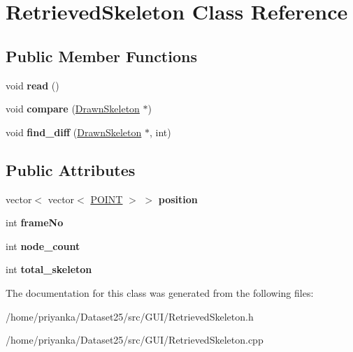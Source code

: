 \hypertarget{classRetrievedSkeleton}{\section{\-Retrieved\-Skeleton \-Class \-Reference}
\label{classRetrievedSkeleton}
}
\subsection*{\-Public \-Member \-Functions}
\begin{DoxyCompactItemize}
\item 
\hypertarget{classRetrievedSkeleton_ab0b91142796e5bce5653b47a7449d54d}{void {\bfseries read} ()}\label{classRetrievedSkeleton_ab0b91142796e5bce5653b47a7449d54d}

\item 
\hypertarget{classRetrievedSkeleton_aff6b1eec8bb28e9571c6d81f3b4ee6a5}{void {\bfseries compare} (\hyperlink{classDrawnSkeleton}{\-Drawn\-Skeleton} $\ast$)}\label{classRetrievedSkeleton_aff6b1eec8bb28e9571c6d81f3b4ee6a5}

\item 
\hypertarget{classRetrievedSkeleton_ab958835824565862540ba0cc701358da}{void {\bfseries find\-\_\-diff} (\hyperlink{classDrawnSkeleton}{\-Drawn\-Skeleton} $\ast$, int)}\label{classRetrievedSkeleton_ab958835824565862540ba0cc701358da}

\end{DoxyCompactItemize}
\subsection*{\-Public \-Attributes}
\begin{DoxyCompactItemize}
\item 
\hypertarget{classRetrievedSkeleton_ad60fef3aad1bc9f9425c6bea6633c268}{vector$<$ vector$<$ \hyperlink{structPOINT}{\-P\-O\-I\-N\-T} $>$ $>$ {\bfseries position}}\label{classRetrievedSkeleton_ad60fef3aad1bc9f9425c6bea6633c268}

\item 
\hypertarget{classRetrievedSkeleton_aad667e65274158e4b5586136b52f137f}{int {\bfseries frame\-No}}\label{classRetrievedSkeleton_aad667e65274158e4b5586136b52f137f}

\item 
\hypertarget{classRetrievedSkeleton_a03732ee286c4c0fe55faa62e5cca2490}{int {\bfseries node\-\_\-count}}\label{classRetrievedSkeleton_a03732ee286c4c0fe55faa62e5cca2490}

\item 
\hypertarget{classRetrievedSkeleton_abdca9dec6d142fc784a6c7712fe54bf9}{int {\bfseries total\-\_\-skeleton}}\label{classRetrievedSkeleton_abdca9dec6d142fc784a6c7712fe54bf9}

\end{DoxyCompactItemize}


\-The documentation for this class was generated from the following files\-:\begin{DoxyCompactItemize}
\item 
/home/priyanka/\-Dataset25/src/\-G\-U\-I/\-Retrieved\-Skeleton.\-h\item 
/home/priyanka/\-Dataset25/src/\-G\-U\-I/\-Retrieved\-Skeleton.\-cpp\end{DoxyCompactItemize}

